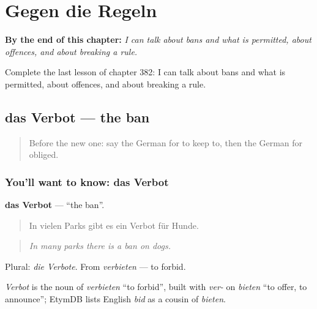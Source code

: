 
\chapter{Gegen die Regeln}
\label{ch:ge-gegen-die-regeln}

\begin{chapteropening}
\textbf{By the end of this chapter:} \emph{I can talk about bans and what is permitted, about offences, and about breaking a rule.}

Complete the last lesson of chapter 382: I can talk about bans and what is permitted, about offences, and about breaking a rule.
\end{chapteropening}

\section[das Verbot]{das Verbot — the ban}

\label{lesson:GE-C382-verbot}



\begin{quote}
Before the new one: say the German for to keep to, then the German for obliged.
\end{quote}

\subsection*{You'll want to know: das Verbot}
\textbf{das Verbot} — \textquotedblleft{}the ban\textquotedblright{}.

\begin{quote}
In vielen Parks gibt es ein Verbot für Hunde.
\end{quote}

\begin{quote}
\emph{In many parks there is a ban on dogs.}
\end{quote}

Plural: \emph{die Verbote}. From \emph{verbieten} — to forbid.

\begin{cousinweb}
\emph{Verbot} is the noun of \emph{verbieten} \textquotedblleft{}to forbid\textquotedblright{}, built with \emph{ver-} on \emph{bieten} \textquotedblleft{}to offer, to announce\textquotedblright{}; EtymDB lists English \emph{bid} as a cousin of \emph{bieten}.
\end{cousinweb}

